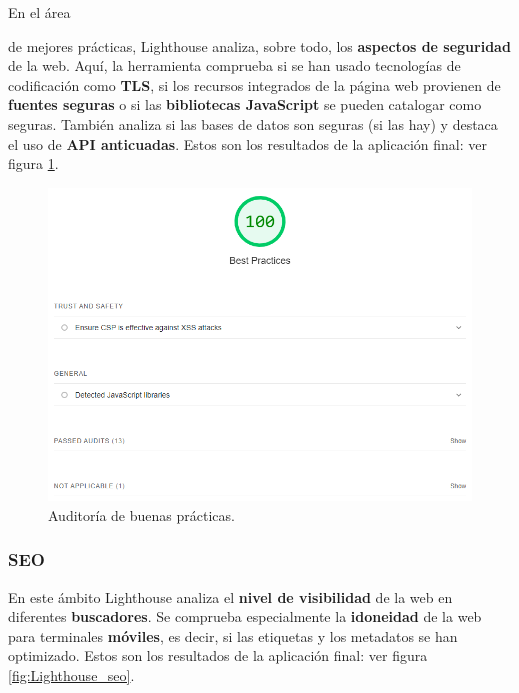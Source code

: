 \documentclass[12pt,twoside,titlepage]{report}
\begin{document}
En el área {de mejores prácticas, Lighthouse analiza, sobre todo, los \textbf{aspectos de seguridad} de la web. Aquí, la herramienta comprueba si se han usado tecnologías de codificación como \textbf{TLS}, si los recursos integrados de la página web provienen de \textbf{fuentes seguras} o si las \textbf{bibliotecas JavaScript} se pueden catalogar como seguras. También analiza si las bases de datos son seguras (si las hay) y destaca el uso de \textbf{API anticuadas}. Estos son los resultados de la aplicación final: ver figura \ref{fig:Lighthouse_bestpractices}.

\begin{figure}[H]
    \centering
    \includegraphics[scale=0.6]{Lighthouse/BestPractices}
    \caption{Auditoría de buenas prácticas.}
    \label{fig:Lighthouse_bestpractices}
\end{figure}

\subsubsection{SEO}

En este ámbito Lighthouse analiza el \textbf{nivel de visibilidad} de la web en diferentes \textbf{buscadores}. Se comprueba especialmente la \textbf{idoneidad} de la web para terminales \textbf{móviles}, es decir, si las etiquetas y los metadatos se han optimizado. Estos son los resultados de la aplicación final: ver figura \ref{fig:Lighthouse_seo}.

}
\end{document}
